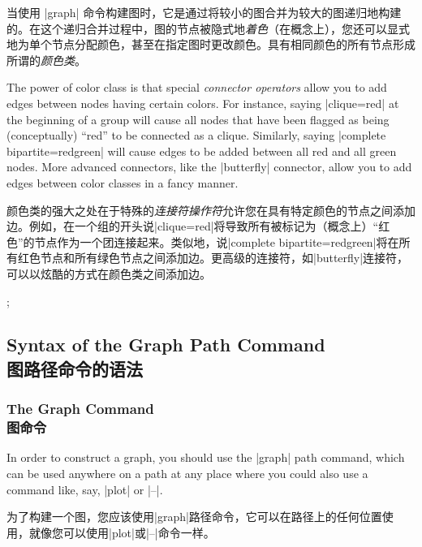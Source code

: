 当使用 |graph| 命令构建图时，它是通过将较小的图合并为较大的图递归地构建的。在这个递归合并过程中，图的节点被隐式地\emph{着色}（在概念上），您还可以显式地为单个节点分配颜色，甚至在指定图时更改颜色。具有相同颜色的所有节点形成所谓的\emph{颜色类}。

The power of color class is that special \emph{connector operators} allow you
to add edges between nodes having certain colors. For instance, saying
|clique=red| at the beginning of a group will cause all nodes that have been
flagged as being (conceptually) ``red'' to be connected as a clique. Similarly,
saying |complete bipartite={red}{green}| will cause edges to be added between
all red and all green nodes. More advanced connectors, like the |butterfly|
connector, allow you to add edges between color classes in a fancy manner.

颜色类的强大之处在于特殊的\emph{连接符操作符}允许您在具有特定颜色的节点之间添加边。例如，在一个组的开头说|clique=red|将导致所有被标记为（概念上）“红色”的节点作为一个团连接起来。类似地，说|complete bipartite={red}{green}|将在所有红色节点和所有绿色节点之间添加边。更高级的连接符，如|butterfly|连接符，可以以炫酷的方式在颜色类之间添加边。

%
\begin{codeexample}[preamble={\usetikzlibrary{graphs}}]
\tikz [x=8mm, y=6mm, circle]
  ;
\end{codeexample}


\subsection{Syntax of the Graph Path Command\\图路径命令的语法}

\subsubsection{The Graph Command\\图命令}

In order to construct a graph, you should use the |graph| path command, which
can be used anywhere on a path at any place where you could also use a command
like, say, |plot| or |--|.

为了构建一个图，您应该使用|graph|路径命令，它可以在路径上的任何位置使用，就像您可以使用|plot|或|--|命令一样。

